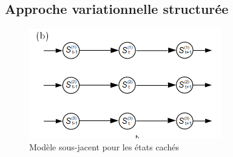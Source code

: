 \documentclass[10pt,a4paper]{article}
\begin{document}
\subsection{Approche variationnelle structurée}

\begin{figure}[H]
\centering
\includegraphics[scale=0.5]{../resources/pictures/struct_mean_field.png}
\caption{Modèle sous-jacent pour les états cachés}
\end{figure}
\end{document}
